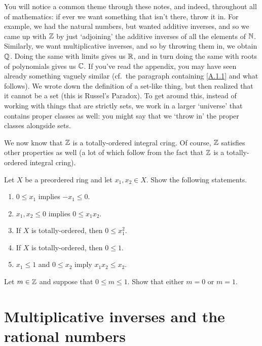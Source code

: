 You will notice a common theme through these notes, and indeed, throughout all of mathematics:  if ever we want something that isn't there, throw it in.  For example, we had the natural numbers, but wanted additive inverses, and so we came up with $\mathbb{Z}$ by just `adjoining' the additive inverses of all the elements of $\mathbb{N}$.  Similarly, we want multiplicative inverses, and so by throwing them in, we obtain $\mathbb{Q}$.  Doing the same with limits gives us $\mathbb{R}$, and in turn doing the same with roots of polynomials gives us $\mathbb{C}$.  If you've read the appendix, you may have seen already something vaguely similar (cf.~the paragraph containing \eqref{A.1.1} and what follows).  We wrote down the definition of a set-like thing, but then realized that it cannot be a set (this is Russel's Paradox).  To get around this, instead of working with things that are strictly sets, we work in a larger `universe' that contains proper classes as well:  you might say that we `throw in' the proper classes alongside sets.

We now know that $\mathbb{Z}$ is a totally-ordered integral cring.  Of course, $\mathbb{Z}$ satisfies other properties as well (a lot of which follow from the fact that $\mathbb{Z}$ is a totally-ordered integral cring).\begin{exr}
Let $X$ be a preordered ring and let $x_1,x_2\in X$.  Show the following statements.
\begin{enumerate}
\item $0\leq x_1$ implies $-x_1\leq 0$.
\item $x_1,x_2\leq 0$ implies $0\leq x_1x_2$.
\item If $X$ is totally-ordered, then $0\leq x_1^2$.
\item If $X$ is totally-ordered, then $0\leq 1$.
\item $x_1\leq 1$ and $0\leq x_2$ imply $x_1x_2\leq x_2$.
\end{enumerate}
\end{exr}
\begin{exr}\label{exr1.2.14}
Let $m\in \mathbb{Z}$ and suppose that $0\leq m\leq 1$.  Show that either $m=0$ or $m=1$.
\end{exr}

\section{Multiplicative inverses and the rational numbers}

